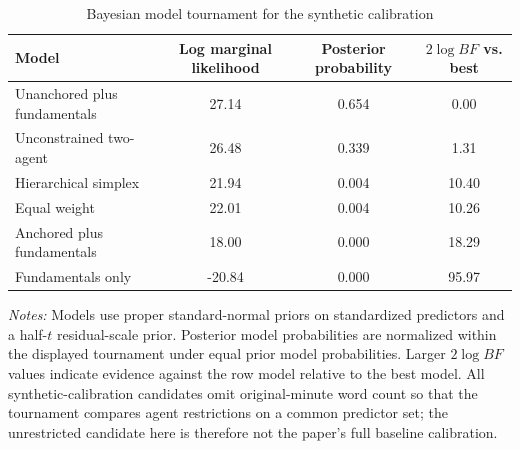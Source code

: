 \begin{table}[htbp]
\color{revisionred}
\centering
\begin{threeparttable}
\caption{Bayesian model tournament for the synthetic calibration}
\label{tab:tournament-calibration}
\begin{scriptsize}
\setlength{\tabcolsep}{4.2pt}
\begin{tabular}{lccc}
\toprule
Model & Log marginal likelihood & Posterior probability & $2\log BF$ vs. best \\
\midrule
Unanchored plus fundamentals & 27.14 & 0.654 & 0.00 \\
Unconstrained two-agent & 26.48 & 0.339 & 1.31 \\
Hierarchical simplex & 21.94 & 0.004 & 10.40 \\
Equal weight & 22.01 & 0.004 & 10.26 \\
Anchored plus fundamentals & 18.00 & 0.000 & 18.29 \\
Fundamentals only & -20.84 & 0.000 & 95.97 \\
\bottomrule
\end{tabular}
\begin{tablenotes}[flushleft]
\scriptsize
\item \textit{Notes:} Models use proper standard-normal priors on standardized predictors and a half-$t$ residual-scale prior. Posterior model probabilities are normalized within the displayed tournament under equal prior model probabilities. Larger $2\log BF$ values indicate evidence against the row model relative to the best model. All synthetic-calibration candidates omit original-minute word count so that the tournament compares agent restrictions on a common predictor set; the unrestricted candidate here is therefore not the paper's full baseline calibration.
\end{tablenotes}
\end{scriptsize}
\end{threeparttable}
\end{table}
